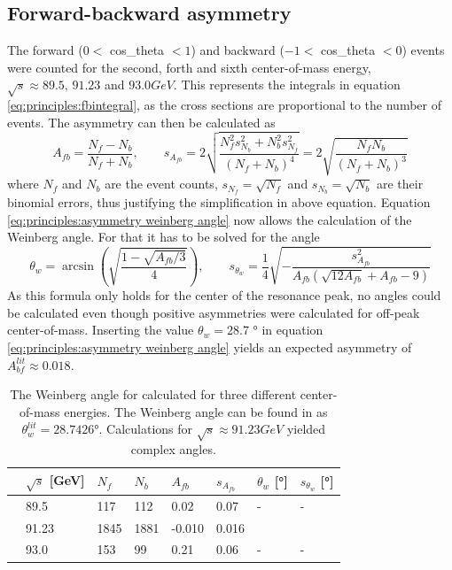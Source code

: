 \subsection{Forward-backward asymmetry}
The forward ($0<$ cos\_theta $<1$) and backward ($-1<$ cos\_theta $<0$) events were counted for the second, forth and sixth center-of-mass energy, $\sqrt{s}\approx89.5\text{, }91.23$ and $\unit{93.0}{GeV}$. This represents the integrals in equation \ref{eq:principles:fbintegral}, as the cross sections are proportional to the number of events. The asymmetry can then be calculated as
\begin{equation}
A_{fb}=\frac{N_f-N_b}{N_f+N_b},\qquad s_{A_{fb}}=2\sqrt{\frac{N_f^2s_{N_b}^2+N_b^2s_{N_f}^2}{(N_f+N_b)^4}}=2\sqrt{\frac{N_fN_b}{(N_f+N_b)^3}}
\end{equation}
where $N_f$ and $N_b$ are the event counts, $s_{N_f}=\sqrt{N_f}$ and $s_{N_b}=\sqrt{N_b}$ are their binomial errors, thus justifying the simplification in above equation. 
Equation \ref{eq:principles:asymmetry weinberg angle} now allows the calculation of the Weinberg angle. For that it has to be solved for the angle
\begin{equation}
\theta_w=\arcsin(\sqrt{\frac{1-\sqrt{A_{fb}/3}}{4}}),\qquad s_{\theta_w}=\frac{1}{4}\sqrt{-\frac{s_{A_{fb}}^2}{A_{fb}(\sqrt{12A_{fb}}+A_{fb}-9)}}
\end{equation}
As this formula only holds for the center of the resonance peak, no angles could be calculated even though positive asymmetries were calculated for off-peak center-of-mass. Inserting the value $\theta_w=28.7$ ° \cite{Grif} in equation \ref{eq:principles:asymmetry weinberg angle} yields an expected asymmetry of $A_{bf}^{lit}\approx0.018$.\\
\begin{table}[h]\centering
	\begin{tabular}{@{}llllllll@{}}
		\toprule
		&$\sqrt{s}$ [GeV]&$N_f$&$N_b$&$A_{fb}$&$s_{A_{fb}}$&$\theta_w$ [°]&$s_{\theta_w}$ [°]\\
		\midrule
		&89.5&117&112&0.02&0.07&-&-\\
		&91.23&1845&1881&-0.010&0.016&&\\
		&93.0&153&99&0.21&0.06&-&-\\
		\bottomrule
	\end{tabular}
	\caption[A\_{fb} and the Weinberg angle]{The Weinberg angle for calculated for three different center-of-mass energies. The Weinberg angle can be found in \cite{muenchen} as $\theta_w^{lit}=28.7426$°. Calculations for $\sqrt{s}\approx\unit{91.23}{GeV}$ yielded complex angles.}
	\label{tb:weinbergangle}
\end{table}
